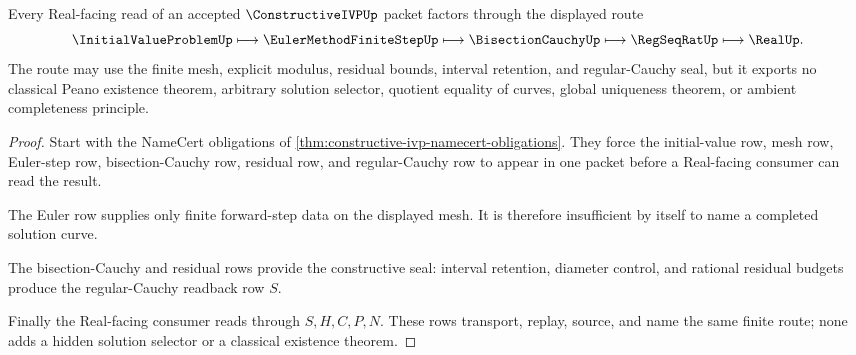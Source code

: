 \begin{theorem}
\label{thm:constructive-ivp-bisection-regular-cauchy-route}
Every Real-facing read of an accepted $\ConstructiveIVPUp$ packet factors through the displayed route
$$
\InitialValueProblemUp \longmapsto \EulerMethodFiniteStepUp \longmapsto \BisectionCauchyUp \longmapsto \RegSeqRatUp \longmapsto \RealUp .
$$
The route may use the finite mesh, explicit modulus, residual bounds, interval retention, and regular-Cauchy seal, but it exports no classical Peano existence theorem, arbitrary solution selector, quotient equality of curves, global uniqueness theorem, or ambient completeness principle.
\end{theorem}
\begin{proof}
Start with the NameCert obligations of \autoref{thm:constructive-ivp-namecert-obligations}. They force the initial-value row, mesh row, Euler-step row, bisection-Cauchy row, residual row, and regular-Cauchy row to appear in one packet before a Real-facing consumer can read the result.

The Euler row supplies only finite forward-step data on the displayed mesh. It is therefore insufficient by itself to name a completed solution curve.

The bisection-Cauchy and residual rows provide the constructive seal: interval retention, diameter control, and rational residual budgets produce the regular-Cauchy readback row $S$.

Finally the Real-facing consumer reads through $S,H,C,P,N$. These rows transport, replay, source, and name the same finite route; none adds a hidden solution selector or a classical existence theorem.
\end{proof}


\begin{closurestatus}{\ConstructiveIVPUp}
  \theoryclosure{\seedClosure}
  \formalstatus{\unformalizedV}
\end{closurestatus}
